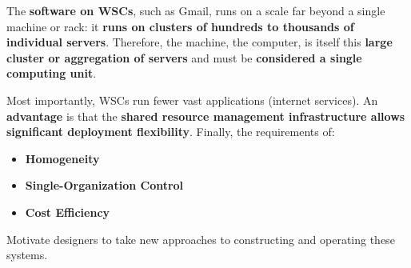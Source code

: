 \documentclass[a4paper]{article}
\newcommand{\example}[1]{\textcolor{Green4}{\textbf{#1}}}
\newcommand{\highspace}{\vspace{1.2em}\noindent}
\begin{document}
    \noindent
    The \textbf{software on WSCs}, such as Gmail, runs on a scale far beyond a single machine or rack: it \textbf{runs on clusters of hundreds to thousands of individual servers}. Therefore, the machine, the computer, is itself this \textbf{large cluster or aggregation of servers} and must be \textbf{considered a single computing unit}.

    \highspace
    Most importantly, WSCs run fewer vast applications (internet services). An \example{advantage} is that the \textbf{shared resource management infrastructure allows significant deployment flexibility}. Finally, the requirements of:
    \begin{itemize}
        \item \textbf{Homogeneity}
        \item \textbf{Single-Organization Control}
        \item \textbf{Cost Efficiency}
    \end{itemize}
    Motivate designers to take new approaches to constructing and operating these systems.



    \newpage

    {}
    

    \newpage

    \printindex
\end{document}
